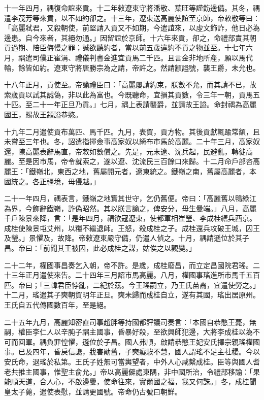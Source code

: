 \begin{pinyinscope}
十一年四月，禑復命誼來貢。十二年敕遼東守將潘敬、葉旺等謹飭邊備。其冬，禑遣李茂芳等來貢，以不如約卻之。十三年，遼東送高麗使誼至京師，帝敕敬等曰：「高麗弒君，又殺朝使，前堅請入貢又不如期，今遣誼來，以虛文飾詐，他日必為邊患。自今來者，其絕勿通。」因留誼於京師。十六年來貢，卻之，命禮部責其朝貢過期、陪臣侮慢之罪；誠欲聽約者，當以前五歲違約不貢之物並至。十七年六月，禑遣司僕正崔涓、禮儀判書金進宜貢馬二千匹。且言金非地所產，願以馬代輸，餘皆如約。遼東守將唐勝宗為之請，帝許之。然請顓謚號，襲王爵，未允也。

十八年正月，貢使至。帝諭禮臣曰：「高麗屢請約束，朕數不允，而其請不已，故索歲貢以試其誠偽，非以此為富也。今既聽命，宜損其貢數，令三年一朝，貢馬五十匹。至二十一年正旦乃貢。」七月，禑上表請襲爵，並請故王謚。命封禑為高麗國王，賜故王顓謚恭愍。

十九年二月遣使貢布萬匹、馬千匹。九月，表賀，貢方物。其後貢獻輒踰常額，且未嘗至三年也。冬，詔遣指揮僉事高家奴以綺布市馬於高麗。二十年三月，高家奴還，陳高麗表辭馬直，帝敕如數償之。先是，元末遼、沈兵起，民避亂，轉徙高麗。至是因市馬，帝令就索之，遂以遼、沈流民三百餘口來歸。十二月命戶部咨高麗王：「鐵嶺北，東西之地，舊屬開元者，遼東統之。鐵嶺之南，舊屬高麗者，本國統之。各正疆境，毋侵越。」

二十一年四月，禑表言，鐵嶺之地實其世守，乞仍舊便。帝曰：「高麗舊以鴨綠江為界，今飾辭鐵嶺，詐偽昭然。其以朕言諭之，俾安分，毋生釁端。」八月，高麗千戶陳景來降，言：「是年四月，禑欲寇遼東，使都軍相崔瑩、李成桂繕兵西京。成桂使陳景屯艾州，以糧不繼退師。王怒，殺成桂之子。成桂還兵攻破王城，囚王及瑩。」景懼及，故降。帝敕遼東嚴守備，仍遣人偵之。十月，禑請遜位於其子昌。帝曰：「前聞其王被囚，此必成桂之謀，姑俟之以觀變。」

二十二年，權國事昌奏乞入朝，帝不許。是歲，成桂廢昌，而立定昌國院君瑤。二十三年正月遣使來告。二十四年三月詔市馬高麗。八月，權國事瑤進所市馬千五百匹。帝曰；「三韓君臣悖亂，二紀於茲。今王瑤嗣立，乃王氏苗裔，宜遣使勞之。」十二月，瑤遣其子奭朝賀明年正旦。奭未歸而成桂自立，遂有其國，瑤出居原州。王氏自五代傳國數百年，至是絕。

二十五年九月，高麗知密直司事趙胖等持國都評議司奏言：「本國自恭愍王薨，無嗣，權臣李仁人以辛肫子禑主國事，昏暴好殺，至欲興師犯邊，大將李成桂以為不可而回軍。禑負罪惶懼，遜位於子昌。國人弗順，啟請恭愍王妃安氏擇宗親瑤權國事。已及四年，昏戾信讒，戕害勛舊，子奭癡騃不慧，國人謂瑤不足主社稷。今以安氏命，退瑤於私第。王氏子姓無可當輿望者，中外人心咸繫成桂。臣等與國人耆老共推主國事，惟聖主俞允。」帝以高麗僻處東隅，非中國所治，令禮部移諭：「果能順天道，合人心，不啟邊釁，使命往來，實爾國之福，我又何誅。」冬，成桂聞皇太子薨，遣使表慰，並請更國號。帝命仍古號曰朝鮮。


\end{pinyinscope}
